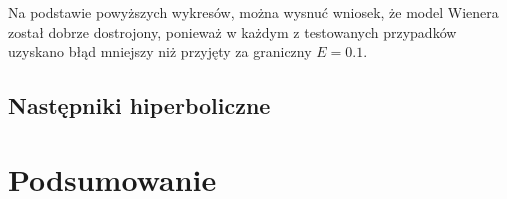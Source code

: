 \documentclass[a4paper,titlepage,11pt,floatssmall]{mwrep}
\begin{document}
Na podstawie powyższych wykresów, można wysnuć wniosek, że model Wienera został dobrze dostrojony, ponieważ w każdym z testowanych przypadków uzyskano błąd mniejszy niż przyjęty za graniczny $E = \num{0.1}$. 

\newpage

\section{Następniki hiperboliczne}

\chapter{Podsumowanie}

\listoffigures
\listoftables
\end{document}
